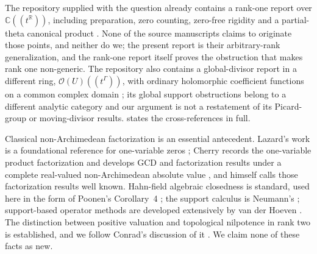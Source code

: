 \documentclass[11pt]{article}
\theoremstyle{plain}
\theoremstyle{plain}
\theoremstyle{plain}
\theoremstyle{definition}
\theoremstyle{definition}
\theoremstyle{definition}
\theoremstyle{definition}
\theoremstyle{remark}
\newcommand{\C}{\mathbb C}\newcommand{\R}{\mathbb R}
\begin{document}
The repository supplied with the question already contains a rank-one report
over $\C((t^\R))$, including preparation, zero counting, zero-free rigidity
and a partial-theta canonical product \cite{RepoRankOne}. None of the source
manuscripts claims to originate those points, and neither do we; the present
report is their arbitrary-rank generalization, and the rank-one report
itself proves the obstruction that makes rank one non-generic. The
repository also contains a global-divisor report in a different ring,
$\mathcal O(U)((t^\Gamma))$, with ordinary holomorphic coefficient functions
on a common complex domain \cite{RepoDivisors}; its global support
obstructions belong to a different analytic category and our argument is not
a restatement of its Picard-group or moving-divisor results.
 states the cross-references in full.

Classical non-Archimedean factorization is an essential antecedent. Lazard's
work is a foundational reference for one-variable zeros \cite{Lazard};
Cherry records the one-variable product factorization and develops GCD and
factorization results under a complete real-valued non-Archimedean absolute
value \cite{Cherry,CherryLectures}, and himself calls those factorization
results well known. Hahn-field algebraic closedness is standard, used here
in the form of Poonen's Corollary~4 \cite{Poonen}; the support calculus is
Neumann's \cite{Neumann}; support-based operator methods are developed
extensively by van der Hoeven \cite{vdH}. The distinction between positive
valuation and topological nilpotence in rank two is established, and we
follow Conrad's discussion of it \cite{Conrad}. We claim none of these facts
as new.
\end{document}
